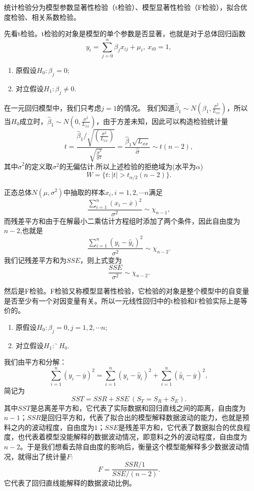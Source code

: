 \documentclass[lang=cn,10pt]{elegantbook}
\begin{document}
    统计检验分为模型参数显著性检验（t检验）、模型显著性检验（F检验），拟合优度检验、相关系数检验。

    先看t检验。t检验的对象是模型的单个参数是否显著，也就是对于总体回归函数
    \[y_i=\sum_{j=0}^{n}\beta_jx_{ij}+\mu_i,\ x_{i0}=1,\]
    \begin{enumerate}
        \item 原假设\(H_0:\beta_j=0\);
        \item 对立假设\(H_1:\beta_j\ne0\).
    \end{enumerate}
    在一元回归模型中，我们只考虑\(j=1\)的情况。
    我们知道\(\hat{\beta}_1\sim N(\beta_1,\frac{\sigma^2}{L_{xx}})\)，所以当\(H_0\)成立时，\(\hat{\beta}_1\sim N(0,\frac{\sigma^2}{L_{xx}})\)，由于方差未知，因此可以构造检验统计量
    \[t=\frac{\hat{\beta}_1/\sqrt{(\frac{\sigma^2}{L_{xx}})}}{\sqrt{\frac{\hat{\sigma}^2}{\sigma^2}}}=\frac{\hat{\beta}_1\sqrt{L_{xx}}}{\hat{\sigma}}\sim t(n-2),\]
    其中\(\hat{\sigma}^2\)的定义取\(\sigma^2\)的无偏估计.所以上述检验的拒绝域为(水平为\(\alpha\))
    \[W=\{t:|t|>t_{\alpha/2}(n-2)\}.\]
    \begin{note}
        正态总体\(N(\mu,\sigma^2)\)中抽取的样本\(x_i,i=1,2,\cdots n\)满足
        \[\frac{\sum_{i=1}^{n}(x_i-\overline{x})^2}{\sigma^2}\sim \chi_{n-1},\]
        而残差平方和由于在解最小二乘估计方程组时添加了两个条件，因此自由度为\(n-2\),也就是
        \[\frac{\sum_{i=1}^{n}(y_i-\hat{y}_i)^2}{\sigma^2}\sim \chi_{n-2}.\]
        我们记残差平方和为\(SSE\)，则上式变为
        \[\frac{SSE}{\sigma^2}\sim \chi_{n-2}.\]
    \end{note}

    然后是F检验。F检验又称模型显著性检验，它检验的对象是整个模型中的自变量是否至少有一个对因变量有关。所以一元线性回归中的t检验和F检验实际上是等价的。
    \begin{enumerate}
        \item 原假设\(H_0:\beta_j=0,j=1,2,\cdots n\);
        \item 对立假设\(H_1:^\neg H_0\).
    \end{enumerate}
    我们由平方和分解：
    \[\sum_{i=1}^{n}(y_i-\overline{y})^2=\sum_{i=1}^{n}(y_i-\hat{y}_i)^2+\sum_{i=1}^{n}(\hat{y}_i-\overline{y})^2,\]
    简记为
    \[SST=SSR+SSE\ (S_T=S_R+S_E).\]
    其中\(SST\)是总离差平方和，它代表了实际数据和回归直线之间的距离，自由度为\(n-1\)；\(SSR\)是回归平方和，代表了拟合出的模型解释数据波动的能力，也就是预料之内的波动程度，自由度为\(1\)；\(SSE\)是残差平方和，它代表了数据拟合的优良程度，也代表着模型没能解释的数据波动情况，即意料之外的波动程度，自由度为\(n-2\)。于是我们想看去除自由度的影响后，衡量这个模型能解释多少数据波动情况，就得出了统计量\(F\):
    \[F=\frac{SSR/1}{SSE/(n-2)}.\]
    它代表了回归直线能解释的数据波动比例。
\end{document}
